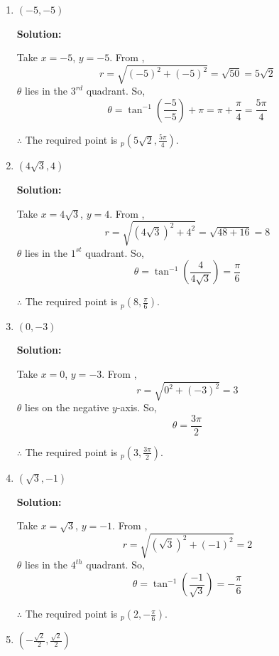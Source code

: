 \documentclass[a4paper]{article}
\begin{document}
\begin{enumerate}
    \item \((-5, -5)\)
    
    \textbf{Solution:}
    
    Take \(x = -5\), \(y = -5\). From ,
    \[
    r = \sqrt{(-5)^2 + (-5)^2} = \sqrt{50} = 5\sqrt{2}
    \]
    \(\theta\) lies in the \(3^{rd}\) quadrant. So,
    \[
    \theta = \tan^{-1}\left(\frac{-5}{-5}\right) + \pi = \pi + \frac{\pi}{4} = \frac{5\pi}{4}
    \]
    
    \(\therefore\) The required point is \(_p(5\sqrt{2}, \frac{5\pi}{4})\).

    \item \(\left(4\sqrt{3}, 4\right)\)
    
    \textbf{Solution:}
    
    Take \(x = 4\sqrt{3}\), \(y = 4\). From ,
    \[
    r = \sqrt{(4\sqrt{3})^2 + 4^2} = \sqrt{48 + 16} = 8
    \]
    \(\theta\) lies in the \(1^{st}\) quadrant. So,
    \[
    \theta = \tan^{-1}\left(\frac{4}{4\sqrt{3}}\right) = \frac{\pi}{6}
    \]
    
    \(\therefore\) The required point is \(_p(8, \frac{\pi}{6})\).

    \item \((0, -3)\)
    
    \textbf{Solution:}
    
    Take \(x = 0\), \(y = -3\). From ,
    \[
    r = \sqrt{0^2 + (-3)^2} = 3
    \]
    \(\theta\) lies on the negative \(y\)-axis. So,
    \[
    \theta = \frac{3\pi}{2}
    \]
    
    \(\therefore\) The required point is \(_p(3, \frac{3\pi}{2})\).

    \item \(\left(\sqrt{3}, -1\right)\)
    
    \textbf{Solution:}
    
    Take \(x = \sqrt{3}\), \(y = -1\). From ,
    \[
    r = \sqrt{(\sqrt{3})^2 + (-1)^2} = 2
    \]
    \(\theta\) lies in the \(4^{th}\) quadrant. So,
    \[
    \theta = \tan^{-1}\left(\frac{-1}{\sqrt{3}}\right) = -\frac{\pi}{6}
    \]
    
    \(\therefore\) The required point is \(_p(2, -\frac{\pi}{6})\).

    \item \(\left(-\frac{\sqrt{2}}{2}, \frac{\sqrt{2}}{2}\right)\)
    

\end{enumerate}
\end{document}
